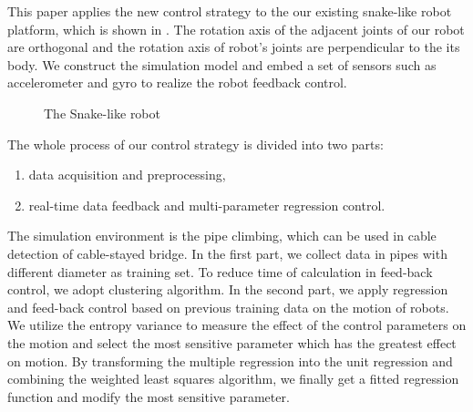 This paper applies the new control strategy to the our existing snake-like robot platform, which is shown in . The rotation axis of the adjacent joints of our robot are orthogonal and the rotation axis of robot's joints are perpendicular to the its body. We construct the simulation model  and embed a set of sensors such as accelerometer and gyro to realize the robot feedback control.
\begin{figure}[H]
	\centering
	\caption{The Snake-like robot}
\end{figure}

The whole process of our control strategy is divided into two parts:

\begin{enumerate}
	\item data acquisition and preprocessing,
	\item real-time data feedback and multi-parameter regression control.
\end{enumerate}

The simulation environment is the pipe climbing, which can be used in cable detection of cable-stayed bridge. In the first part, we collect data in pipes with different diameter as training set. To reduce time of calculation in feed-back control, we adopt clustering algorithm\cite{Cluseter_ICT}\cite{KmeansAndDeepLearning}. In the second part, we apply regression and feed-back control based on previous training data on the motion of robots. We utilize the entropy variance\cite{WaveformEntropyVariance}\cite{EntropyandVarianceasRiskMeasure}\cite{UsingEntropyAndVariance} to measure the effect of the control parameters on the motion and select the most sensitive parameter which has the greatest effect on motion. By transforming the multiple regression into the unit regression and combining the weighted least squares algorithm\cite{gradientMethod}\cite{MSEestimates}, we finally get a fitted regression function and modify the most sensitive parameter.

